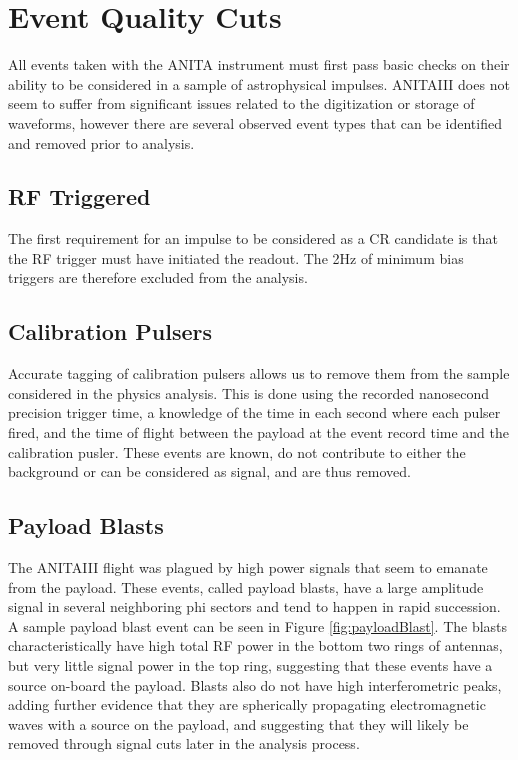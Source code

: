 	
\section{Event Quality Cuts}%
	All events taken with the ANITA instrument must first pass basic checks on their ability to be considered in a sample of astrophysical impulses.  ANITAIII does not seem to suffer from significant issues related to the digitization or storage of waveforms, however there are several observed event types that can be identified and removed prior to analysis.

	\subsection{RF Triggered}
		The first requirement for an impulse to be considered as a CR candidate is that the RF trigger must have initiated the readout.  The 2Hz of minimum bias triggers are therefore excluded from the analysis.

	\subsection{Calibration Pulsers}
		Accurate tagging of calibration pulsers allows us to remove them from the sample considered in the physics analysis.  This is done using the recorded nanosecond precision trigger time, a knowledge of the time in each second where each pulser fired, and the time of flight between the payload at the event record time and the calibration pusler.  These events are known, do not contribute to either the background or can be considered as signal, and are thus removed.

	\subsection{Payload Blasts}
		The ANITAIII flight was plagued by high power signals that seem to emanate from the payload.  These events, called payload blasts, have a large amplitude signal in several neighboring phi sectors and tend to happen in rapid succession.  A sample payload blast event can be seen in Figure \ref{fig:payloadBlast}.  The blasts characteristically have high total RF power in the bottom two rings of antennas, but very little signal power in the top ring, suggesting that these events have a source on-board the payload.  Blasts also do not have high interferometric peaks, adding further evidence that they are spherically propagating electromagnetic waves with a source on the payload, and suggesting that they will likely be removed through signal cuts later in the analysis process.
		
